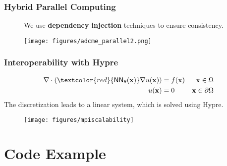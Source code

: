 \documentclass[usenames,dvipsnames]{beamer}
\newcommand{\bx}{\mathbf{x}}
\begin{document}
\begin{frame}
	\frametitle{Hybrid Parallel Computing}
	\begin{figure}
	\item We use \textbf{dependency injection} techniques to ensure consistency.
	\end{figure}
	\begin{figure}[hbt]
		\texttt{[image: figures/adcme\_parallel2.png]}
	\end{figure}
\end{frame}






\begin{frame}
	\frametitle{Interoperability with Hypre}

	\begin{equation*}
		\begin{aligned}
			\nabla \cdot (\textcolor{red}{\textsf{NN}_\theta(\bx)} \nabla u(\bx)) & = f(\bx) & \bx \in \Omega \\ 
			u(\bx) &= 0 & \bx \in \partial \Omega
		\end{aligned}
	\end{equation*}
The discretization leads to a linear system, which is solved using Hypre.
		
\begin{figure}[hbt]
	\centering
	\texttt{[image: figures/mpiscalability]}
\end{figure}
	

\end{frame}





\section{Code Example}
\end{document}
